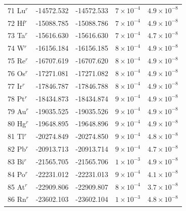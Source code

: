 \begin{longtable}{l r r r r}
71 Lu$^{r}$ &   -14572.532        & -14572.533        &   $7\times10^{-4}$      &   $4.9\times10^{-8}$    \\
72 Hf$^{r}$ &   -15088.785        & -15088.786        &   $7\times10^{-4}$      &   $4.9\times10^{-8}$    \\
73 Ta$^{r}$ &   -15616.630        & -15616.630        &   $7\times10^{-4}$      &   $4.7\times10^{-8}$    \\
74 W$^{r}$  &   -16156.184        & -16156.185        &   $8\times10^{-4}$      &   $4.9\times10^{-8}$    \\
75 Re$^{r}$ &   -16707.619        & -16707.620        &   $8\times10^{-4}$      &   $4.9\times10^{-8}$    \\
76 Os$^{r}$ &   -17271.081        & -17271.082        &   $8\times10^{-4}$      &   $4.9\times10^{-8}$    \\
77 Ir$^{r}$ &   -17846.787        & -17846.788        &   $8\times10^{-4}$      &   $4.9\times10^{-8}$    \\
78 Pt$^{r}$ &   -18434.873        & -18434.874        &   $9\times10^{-4}$      &   $4.9\times10^{-8}$    \\
79 Au$^{r}$ &   -19035.525        & -19035.526        &   $9\times10^{-4}$      &   $4.9\times10^{-8}$    \\
80 Hg$^{r}$ &   -19648.895        & -19648.896        &   $9\times10^{-4}$      &   $4.9\times10^{-8}$    \\
81 Tl$^{r}$ &   -20274.849        & -20274.850        &   $9\times10^{-4}$      &   $4.8\times10^{-8}$    \\
82 Pb$^{r}$ &   -20913.713        & -20913.714        &   $9\times10^{-4}$      &   $4.7\times10^{-8}$    \\
83 Bi$^{r}$ &   -21565.705        & -21565.706        &   $1\times10^{-3}$      &   $4.9\times10^{-8}$    \\
84 Po$^{r}$ &   -22231.012        & -22231.013        &   $9\times10^{-4}$      &   $4.1\times10^{-8}$    \\
85 At$^{r}$ &   -22909.806        & -22909.807        &   $8\times10^{-4}$      &   $3.7\times10^{-8}$    \\
86 Rn$^{r}$ &   -23602.103        & -23602.104        &   $1\times10^{-3}$      &   $4.8\times10^{-8}$    \\
\bottomrule  	
\end{longtable}


